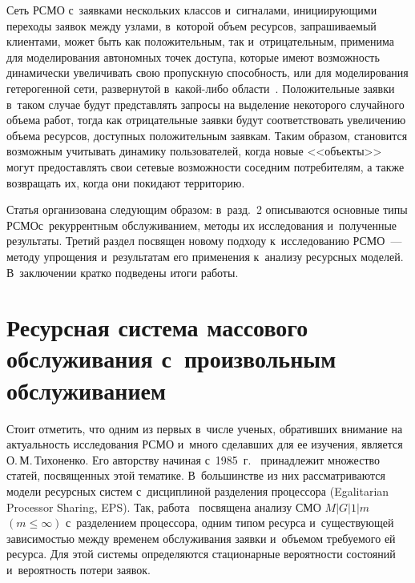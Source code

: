 \begin{multicols}{2}
Сеть РСМО с~заявками нескольких 
классов и~сигналами, инициирующими переходы заявок между узлами, в~которой объем 
ресурсов, запрашиваемый клиентами, может быть как положительным, так 
и~отрицательным, применима для моделирования автономных точек доступа, которые 
имеют возможность динамически увеличивать свою пропускную способность, или для 
моделирования гетерогенной сети, развернутой в~ка\-кой-ли\-бо 
области~\cite{Sopin_12_2017,Sopin_13_2017,Naumov_14_2017,Naumov_15_2017}. Положительные 
заявки в~таком случае будут представлять запросы на выделение некоторого 
случайного объема работ, тогда как отрицательные заявки будут соответствовать 
увеличению объема ресурсов, доступных положительным заявкам.
Таким образом, становится возможным учитывать динамику пользователей,
когда новые <<объекты>> могут предоставлять свои сетевые возможности соседним 
потребителям, а также возвращать их, когда они покидают территорию.

Статья организована следующим образом: в~разд.~2 описываются основные типы 
РСМО\linebreak с~рекуррентным обслуживанием, методы их 
исследования и~полученные результаты. Третий раздел посвящен новому подходу 
к~исследованию РСМО~--- методу упрощения и~результатам его применения 
к~анализу ресурсных моделей. В~заключении кратко подведены итоги работы.



\section{Ресурсная система массового обслуживания с~произвольным обслуживанием}


Стоит отметить, что одним из первых в~числе ученых, обративших внимание на 
актуальность исследования РСМО и~много сделавших для ее изуче\-ния, является 
О.\,М.\,Тихоненко. Его авторству начиная с~1985~г.~\cite{Tihonenko_27_1985} 
принадлежит множество статей, посвященных этой тематике. В~большинстве из них 
рассматриваются модели ресурсных сис\-тем с~дисциплиной разделения процессора 
(Egalitarian Processor Sharing, EPS). Так, работа~\cite{Tihonenko_22_2001} 
посвящена анализу СМО $M|G|1|m$ $(m\leq\infty)$ с~разделением процессора, 
одним типом ресурса и~существующей зависимостью между временем обслуживания 
заявки и~объемом требуемого ей ресурса. Для этой сис\-те\-мы определяются 
стационарные вероятности состояний и~вероятность потери заявок.


\end{multicols}
